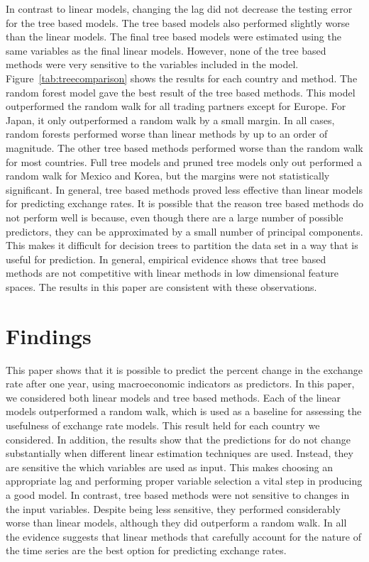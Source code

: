 \documentclass{sig-alternate-05-2015}
\begin{document}
\par{} In contrast to linear models, changing the lag did not decrease the testing error for the tree based models. The tree based models also performed slightly worse than the linear models. The final tree based models were estimated using the same variables as the final linear models. However, none of the tree based methods were very sensitive to the variables included in the model. Figure~\ref{tab:treecomparison} shows the results for each country and method. The random forest model gave the best result of the  tree based methods. This model outperformed the random walk for all trading partners except for Europe. For Japan, it only outperformed a random walk by a small margin. In all cases, random forests performed worse than linear methods by up to an order of magnitude. The other tree based methods performed worse than the random walk for most countries. Full tree models and pruned tree models only out performed a random walk for Mexico and Korea, but the margins were not statistically significant. In general, tree based methods proved less effective than linear models for predicting exchange rates. It is possible that the reason tree based methods do not perform well is because, even though there are a large number of possible predictors, they can be approximated by a small number of principal components. This makes it difficult for decision trees to partition the data set in a way that is useful for prediction. In general, empirical evidence shows that tree based methods are not competitive with linear methods in low dimensional feature spaces. The results in this paper are consistent with these observations.


\section{Findings}

This paper shows that it is possible to predict the percent change in the exchange rate after one year, using macroeconomic indicators as predictors. In this paper, we considered both linear models and tree based methods. Each of the linear models outperformed a random walk, which is used as a baseline for assessing the usefulness of exchange rate models. This result held for each country we considered. In addition, the results show that the predictions for do not change substantially when different linear estimation techniques are used. Instead, they are sensitive the which variables are used as input. This makes choosing an appropriate lag and performing proper variable selection a vital step in producing a good model. In contrast, tree based methods were not sensitive to changes in the input variables. Despite being less sensitive, they performed considerably worse than linear models, although they did outperform a random walk. In all the evidence suggests that linear methods that carefully account for the nature of the time series are the best option for predicting exchange rates.
\end{document}
